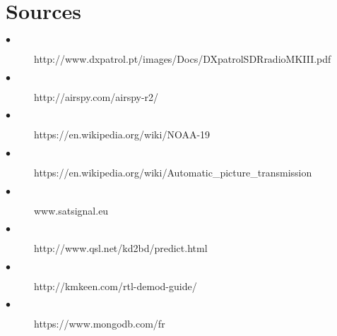 \documentclass[12pt,fleqn]{book} %
\begin{document}
\part{Sources}
\label{Sources}
\appendix

\begin{description}
\item[$\bullet$] http://www.dxpatrol.pt/images/Docs/DXpatrolSDRradioMKIII.pdf
\item[$\bullet$] http://airspy.com/airspy-r2/
\item[$\bullet$] https://en.wikipedia.org/wiki/NOAA-19
\item[$\bullet$] https://en.wikipedia.org/wiki/Automatic\_picture\_transmission
\item[$\bullet$] www.satsignal.eu
\item[$\bullet$] http://www.qsl.net/kd2bd/predict.html
\item[$\bullet$] http://kmkeen.com/rtl-demod-guide/
\item[$\bullet$] https://www.mongodb.com/fr
\end{description} 
\end{document}
